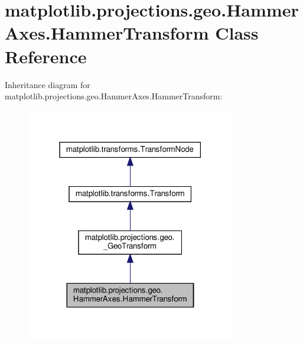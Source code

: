 \hypertarget{classmatplotlib_1_1projections_1_1geo_1_1HammerAxes_1_1HammerTransform}{}\section{matplotlib.\+projections.\+geo.\+Hammer\+Axes.\+Hammer\+Transform Class Reference}
\label{classmatplotlib_1_1projections_1_1geo_1_1HammerAxes_1_1HammerTransform}


Inheritance diagram for matplotlib.\+projections.\+geo.\+Hammer\+Axes.\+Hammer\+Transform\+:
\nopagebreak
\begin{figure}[H]
\begin{center}
\leavevmode
\includegraphics[width=259pt]{classmatplotlib_1_1projections_1_1geo_1_1HammerAxes_1_1HammerTransform__inherit__graph}
\end{center}
\end{figure}


